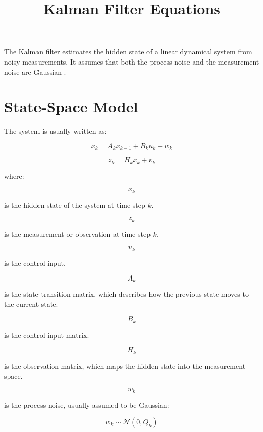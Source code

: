 \documentclass[a4paper]{article}
\title{Kalman Filter Equations}
\date{}
\begin{document}
    \maketitle
    
    The Kalman filter estimates the hidden state of a linear dynamical system from noisy measurements. It assumes that both the process noise and the measurement noise are Gaussian \cite{kalman-1960-a-new-approach-to-linear-filtering-and-prediction-problems}.
    
    
    \section{State-Space Model}
        
        The system is usually written as:
        
        \[
            x_k = A_k x_{k-1} + B_k u_k + w_k
        \]
        
        \[
            z_k = H_k x_k + v_k
        \]
        
        where:
        
        \[
            x_k
        \]
        
        is the hidden state of the system at time step \(k\).
        
        \[
            z_k
        \]
        
        is the measurement or observation at time step \(k\).
        
        \[
            u_k
        \]
        
        is the control input.
        
        \[
            A_k
        \]
        
        is the state transition matrix, which describes how the previous state moves to the current state.
        
        \[
            B_k
        \]
        
        is the control-input matrix.
        
        \[
            H_k
        \]
        
        is the observation matrix, which maps the hidden state into the measurement space.
        
        \[
            w_k
        \]
        
        is the process noise, usually assumed to be Gaussian:
        
        \[
            w_k \sim \mathcal{N}(0, Q_k)
        \]
        
\end{document}
